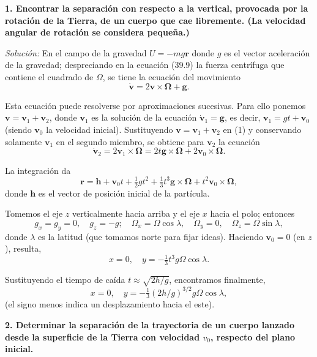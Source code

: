 \documentclass[12pt]{article}
\begin{document}
\textbf{1. Encontrar la separación con respecto a la vertical, provocada por la rotación de la Tierra, de un cuerpo que cae libremente. (La velocidad angular de rotación se considera pequeña.)}

\textit{Solución:} En el campo de la gravedad $U = -mg\mathbf{r}$ donde $g$ es el vector aceleración de la gravedad; despreciando en la ecuación (39.9) la fuerza centrífuga que contiene el cuadrado de $\Omega$, se tiene la ecuación del movimiento
\begin{equation}
\dot{\mathbf{v}} = 2\mathbf{v} \times \mathbf{\Omega} + \mathbf{g}. \tag{1}
\end{equation}

Esta ecuación puede resolverse por aproximaciones sucesivas. Para ello ponemos $\mathbf{v} = \mathbf{v}_1 + \mathbf{v}_2$, donde $\mathbf{v}_1$ es la solución de la ecuación $\dot{\mathbf{v}}_1 = \mathbf{g}$, es decir, $\mathbf{v}_1 = g t + \mathbf{v}_0$ (siendo $\mathbf{v}_0$ la velocidad inicial). Sustituyendo $\mathbf{v} = \mathbf{v}_1 + \mathbf{v}_2$ en (1) y conservando solamente $\mathbf{v}_1$ en el segundo miembro, se obtiene para $\mathbf{v}_2$ la ecuación
\[
\dot{\mathbf{v}}_2 = 2\mathbf{v}_1 \times \mathbf{\Omega} = 2t\mathbf{g} \times \mathbf{\Omega} + 2\mathbf{v}_0 \times \mathbf{\Omega}.
\]

La integración da
\begin{equation}
\mathbf{r} = \mathbf{h} + \mathbf{v}_0 t + \tfrac{1}{2} g t^2 + \tfrac{1}{3} t^3 \mathbf{g} \times \mathbf{\Omega} + t^2 \mathbf{v}_0 \times \mathbf{\Omega},
\tag{2}
\end{equation}
donde $\mathbf{h}$ es el vector de posición inicial de la partícula.

Tomemos el eje $z$ verticalmente hacia arriba y el eje $x$ hacia el polo; entonces
\[
g_x = g_y = 0, \quad g_z = -g; \quad \Omega_x = \Omega \cos \lambda, \quad \Omega_y = 0, \quad \Omega_z = \Omega \sin \lambda,
\]
donde $\lambda$ es la latitud (que tomamos norte para fijar ideas). Haciendo $\mathbf{v}_0 = 0$ (en $z$), resulta,
\[
x = 0, \quad y = -\tfrac{1}{3} t^3 g \Omega \cos \lambda.
\]

Sustituyendo el tiempo de caída $t \approx \sqrt{2h/g}$, encontramos finalmente,
\[
x = 0, \quad y = -\tfrac{1}{3} (2h/g)^{3/2} g \Omega \cos \lambda,
\]
(el signo menos indica un desplazamiento hacia el este).

\vspace{1em}

\textbf{2. Determinar la separación de la trayectoria de un cuerpo lanzado desde la superficie de la Tierra con velocidad $v_0$, respecto del plano inicial.}
\end{document}
